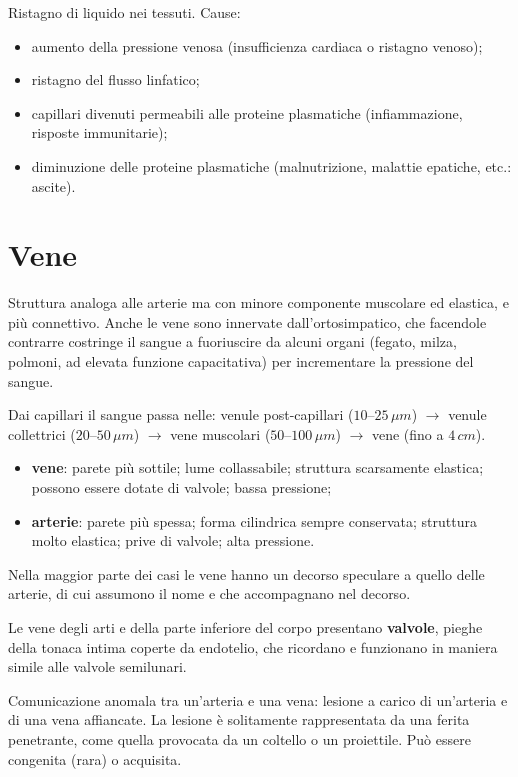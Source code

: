 Ristagno di liquido nei tessuti. Cause:
\begin{itemize}
  \item aumento della pressione venosa (insufficienza cardiaca o ristagno venoso);
  \item ristagno del flusso linfatico;
  \item capillari divenuti permeabili alle proteine plasmatiche (infiammazione, risposte
    immunitarie);
  \item diminuzione delle proteine plasmatiche (malnutrizione, malattie epatiche, etc.: ascite).
\end{itemize}

\section{Vene}

Struttura analoga alle arterie ma con minore componente muscolare ed elastica, e più connettivo.
Anche le vene sono innervate dall'ortosimpatico, che facendole contrarre costringe il sangue a
fuoriuscire da alcuni organi (fegato, milza, polmoni, ad elevata funzione capacitativa) per
incrementare la pressione del sangue.

Dai capillari il sangue passa nelle: venule post-capillari ($10$--$25\,\mu m$)
$\rightarrow$ venule collettrici ($20$--$50\,\mu m$) $\rightarrow$ vene muscolari
($50$--$100\,\mu m$) $\rightarrow$ vene (fino a $4\,cm$).

\begin{itemize}
  \item \textbf{vene}: parete più sottile; lume collassabile; struttura scarsamente elastica;
    possono essere dotate di valvole; bassa pressione;
  \item \textbf{arterie}: parete più spessa; forma cilindrica sempre conservata; struttura molto
    elastica; prive di valvole; alta pressione.
\end{itemize}

Nella maggior parte dei casi le vene hanno un decorso speculare a quello delle arterie, di cui
assumono il nome e che accompagnano nel decorso.

Le vene degli arti e della parte inferiore del corpo presentano \textbf{valvole}, pieghe della
tonaca intima coperte da endotelio, che ricordano e funzionano in maniera simile alle valvole
semilunari.

Comunicazione anomala tra un'arteria e una vena: lesione a carico di un'arteria e di una vena
affiancate. La lesione è solitamente rappresentata da una ferita penetrante, come quella provocata
da un coltello o un proiettile. Può essere congenita (rara) o acquisita.

